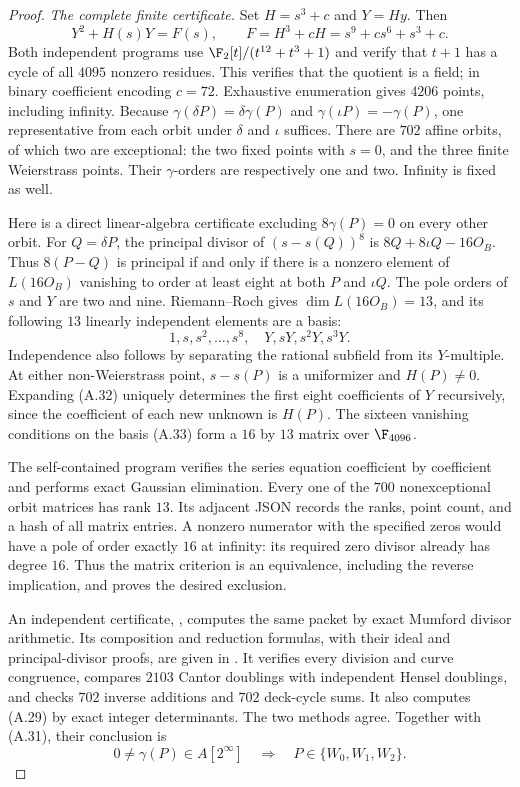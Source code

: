 \begin{proof}
\emph{The complete finite certificate.}
Set $H=s^3+c$ and $Y=Hy$. Then
\[
 Y^2+H(s)Y=F(s),\qquad
 F=H^3+cH=s^9+c s^6+s^3+c.                              \tag{A.32}
\]
Both independent programs use
$\F_2[t]/(t^{12}+t^3+1)$ and verify that $t+1$ has a
cycle of all $4095$ nonzero residues. This verifies that
the quotient is a field; in binary coefficient encoding
$c=72$. Exhaustive enumeration gives $4206$ points,
including infinity. Because $\gamma(\delta P)=\delta\gamma(P)$
and $\gamma(\iota P)=-\gamma(P)$, one representative
from each orbit under $\delta$ and $\iota$ suffices.
There are $702$ affine orbits, of which two are exceptional:
the two fixed points with $s=0$, and the three finite
Weierstrass points. Their $\gamma$-orders are respectively
one and two. Infinity is fixed as well.

Here is a direct linear-algebra certificate excluding
$8\gamma(P)=0$ on every other orbit. For $Q=\delta P$,
the principal divisor of $(s-s(Q))^8$ is
$8Q+8\iota Q-16O_B$. Thus $8(P-Q)$ is principal
if and only if there is a nonzero element of
$L(16O_B)$ vanishing to order at least eight at both
$P$ and $\iota Q$. The pole orders of $s$ and $Y$ are
two and nine. Riemann--Roch gives $\dim L(16O_B)=13$,
and its following $13$ linearly independent elements
are a basis:
\[
 1,s,s^2,\ldots,s^8,\quad Y,sY,s^2Y,s^3Y.              \tag{A.33}
\]
Independence also follows by separating the rational
subfield from its $Y$-multiple. At either non-Weierstrass
point, $s-s(P)$ is a uniformizer and $H(P)\ne0$.
Expanding (A.32) uniquely determines the first eight
coefficients of $Y$ recursively, since the coefficient
of each new unknown is $H(P)$. The sixteen vanishing
conditions on the basis (A.33) form a $16$ by $13$
matrix over $\F_{4096}$.

The self-contained program
 verifies
the series equation coefficient by coefficient and
performs exact Gaussian elimination. Every one of the
$700$ nonexceptional orbit matrices has rank $13$.
Its adjacent JSON records the ranks, point count, and
a hash of all matrix entries. A nonzero numerator with
the specified zeros would have a pole of order exactly
$16$ at infinity: its required zero divisor already
has degree $16$. Thus the matrix criterion is an
equivalence, including the reverse implication, and
proves the desired exclusion.

An independent certificate,
, computes the
same packet by exact Mumford divisor arithmetic. Its
composition and reduction formulas, with their ideal
and principal-divisor proofs, are given in
. It verifies
every division and curve congruence, compares $2103$
Cantor doublings with independent Hensel doublings,
and checks $702$ inverse additions and $702$ deck-cycle
sums. It also computes (A.29) by exact integer
determinants. The two methods agree. Together with
(A.31), their conclusion is
\[
 0\ne\gamma(P)\in A[2^\infty]
                  \quad\Longrightarrow\quad
                  P\in\{W_0,W_1,W_2\}.                \tag{A.34}
\]


\end{proof}
